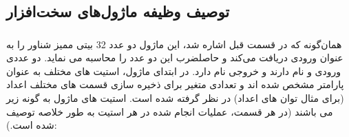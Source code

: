 \documentclass[12pt,titlepage,a4page , tikz , multi,table , svgnames,xcdraw]{article}
\begin{document}
\subsection{توصیف وظیفه ماژول‌های سخت‌افزار}
\subsubsection{}
همان‌گونه که در قسمت قبل اشاره شد، این ماژول دو عدد 32 بیتی ممیز شناور را به عنوان ورودی دریافت می‌کند و حاصلضرب این دو عدد را محاسبه می نماید. دو عددی ورودی 
 و 
 نام دارند و خروجی 
 نام دارد. در ابتدای ماژول، استیت های مختلف به عنوان پارامتر مشخص شده اند و تعدادی متغیر برای ذخیره سازی قسمت های مختلف اعداد (برای مثال توان های اعداد) در نظر گرفته شده است. استیت های ماژول به گونه زیر می باشند (در هر قسمت، عملیات انجام شده در هر استیت به طور خلاصه توصیف شده است.): 
\end{document}
